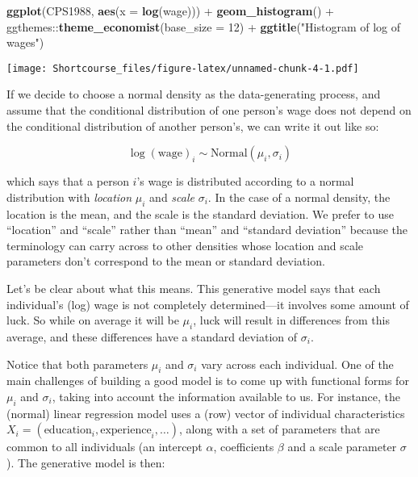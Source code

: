 \documentclass[]{book}
\newenvironment{Shaded}{\begin{snugshade}}{\end{snugshade}}
\newcommand{\KeywordTok}[1]{\textcolor[rgb]{0.13,0.29,0.53}{\textbf{{#1}}}}
\newcommand{\DataTypeTok}[1]{\textcolor[rgb]{0.13,0.29,0.53}{{#1}}}
\newcommand{\DecValTok}[1]{\textcolor[rgb]{0.00,0.00,0.81}{{#1}}}
\newcommand{\StringTok}[1]{\textcolor[rgb]{0.31,0.60,0.02}{{#1}}}
\newcommand{\NormalTok}[1]{{#1}}
\begin{document}
\begin{Shaded}
\begin{Highlighting}[]
\KeywordTok{ggplot}\NormalTok{(CPS1988, }\KeywordTok{aes}\NormalTok{(}\DataTypeTok{x =} \KeywordTok{log}\NormalTok{(wage))) +}
\StringTok{  }\KeywordTok{geom_histogram}\NormalTok{() +}\StringTok{ }
\StringTok{  }\NormalTok{ggthemes::}\KeywordTok{theme_economist}\NormalTok{(}\DataTypeTok{base_size =} \DecValTok{12}\NormalTok{) +}
\StringTok{  }\KeywordTok{ggtitle}\NormalTok{(}\StringTok{"Histogram of log of wages"}\NormalTok{)}
\end{Highlighting}
\end{Shaded}

\texttt{[image: Shortcourse\_files/figure-latex/unnamed-chunk-4-1.pdf]}

If we decide to choose a normal density as the data-generating process,
and assume that the conditional distribution of one person's wage does
not depend on the conditional distribution of another person's, we can
write it out like so:

\[
\log(\mbox{wage})_{i} \sim \mbox{Normal}(\mu_{i}, \sigma_{i})
\]

which says that a person \(i\)'s wage is distributed according to a
normal distribution with \emph{location} \(\mu_{i}\) and \emph{scale}
\(\sigma_{i}\). In the case of a normal density, the location is the
mean, and the scale is the standard deviation. We prefer to use
``location'' and ``scale'' rather than ``mean'' and ``standard
deviation'' because the terminology can carry across to other densities
whose location and scale parameters don't correspond to the mean or
standard deviation.

Let's be clear about what this means. This generative model says that
each individual's (log) wage is not completely determined---it involves
some amount of luck. So while on average it will be \(\mu_{i}\), luck
will result in differences from this average, and these differences have
a standard deviation of \(\sigma_{i}\).

Notice that both parameters \(\mu_{i}\) and \(\sigma_{i}\) vary across
each individual. One of the main challenges of building a good model is
to come up with functional forms for \(\mu_{i}\) and \(\sigma_{i}\),
taking into account the information available to us. For instance, the
(normal) linear regression model uses a (row) vector of individual
characteristics
\(X_{i} = (\mbox{education}_{i},\mbox{experience}_{i}, \dots)\), along
with a set of parameters that are common to all individuals (an
intercept \(\alpha\), coefficients \(\beta\) and a scale parameter
\(\sigma\)). The generative model is then:
\end{document}
